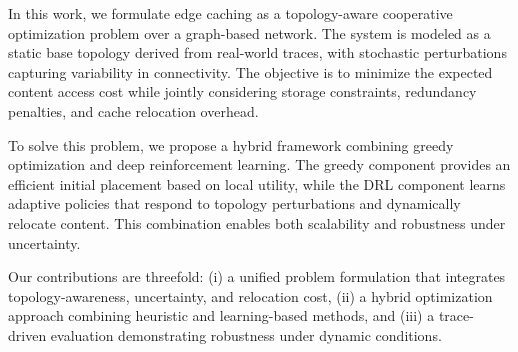 In this work, we formulate edge caching as a topology-aware cooperative optimization problem over a graph-based network. The system is modeled as a static base topology derived from real-world traces, with stochastic perturbations capturing variability in connectivity. The objective is to minimize the expected content access cost while jointly considering storage constraints, redundancy penalties, and cache relocation overhead.

To solve this problem, we propose a hybrid framework combining greedy optimization and deep reinforcement learning. The greedy component provides an efficient initial placement based on local utility, while the DRL component learns adaptive policies that respond to topology perturbations and dynamically relocate content. This combination enables both scalability and robustness under uncertainty.

Our contributions are threefold:
(i) a unified problem formulation that integrates topology-awareness, uncertainty, and relocation cost,
(ii) a hybrid optimization approach combining heuristic and learning-based methods, and
(iii) a trace-driven evaluation demonstrating robustness under dynamic conditions.
